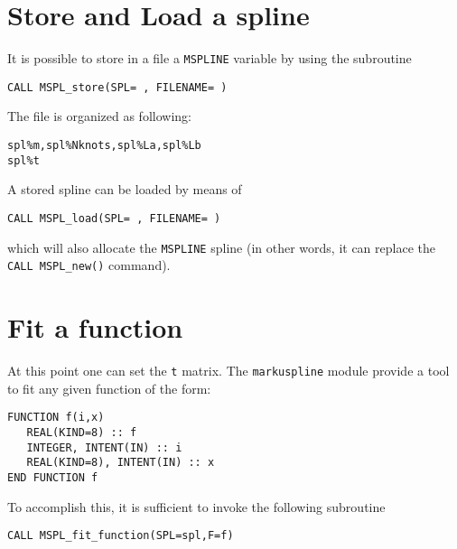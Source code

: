 \documentclass[11pt,a4paper,twoside]{article}
\begin{document}
\section{Store and Load a spline}
It is possible to store in a file a \verb+MSPLINE+ variable by using the subroutine
\begin{verbatim}
CALL MSPL_store(SPL= , FILENAME= )
\end{verbatim}
The file is organized as following:
\begin{verbatim}
spl%m,spl%Nknots,spl%La,spl%Lb
spl%t
\end{verbatim}

A stored spline can be loaded by means of
\begin{verbatim}
CALL MSPL_load(SPL= , FILENAME= )
\end{verbatim}
which will also allocate the \verb+MSPLINE+ spline (in other words, it can replace the \verb+CALL MSPL_new()+ command).

\section{Fit a function}
At this point one can set the \verb+t+ matrix.
The \verb+markuspline+ module provide a tool to fit any given function of the form:
\begin{verbatim}
FUNCTION f(i,x)
   REAL(KIND=8) :: f
   INTEGER, INTENT(IN) :: i
   REAL(KIND=8), INTENT(IN) :: x
END FUNCTION f
\end{verbatim}
To accomplish this, it is sufficient to invoke the following subroutine
\begin{verbatim}
CALL MSPL_fit_function(SPL=spl,F=f)
\end{verbatim}
\end{document}
